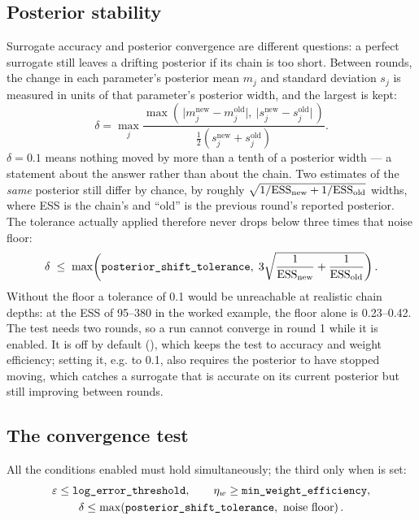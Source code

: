 \subsection{Posterior stability}

Surrogate accuracy and posterior convergence are different questions: a perfect surrogate still
leaves a drifting posterior if its chain is too short. Between rounds, the change in each
parameter's posterior mean $m_j$ and standard deviation $s_j$ is measured in units of that
parameter's posterior width, and the largest is kept:
\begin{equation}
  \delta = \max_j
  \frac{\max\!\left(\,\big|m_j^{\mathrm{new}} - m_j^{\mathrm{old}}\big|,\ \big|s_j^{\mathrm{new}} - s_j^{\mathrm{old}}\big|\,\right)}
       {\tfrac12\left(s_j^{\mathrm{new}} + s_j^{\mathrm{old}}\right)} .
  \label{eq:delta}
\end{equation}
$\delta = 0.1$ means nothing moved by more than a tenth of a posterior width --- a statement about
the answer rather than about the chain. Two estimates of the \emph{same} posterior still differ by
chance, by roughly $\sqrt{1/\mathrm{ESS}_{\mathrm{new}} + 1/\mathrm{ESS}_{\mathrm{old}}}$ widths, where ESS is the
chain's and ``old'' is the previous round's reported posterior. The tolerance actually applied
therefore never drops below three times that noise floor:
\begin{equation}
  \delta \;\le\; \max\!\left(\texttt{posterior\_shift\_tolerance},\;
  3\sqrt{\frac{1}{\mathrm{ESS}_{\mathrm{new}}} + \frac{1}{\mathrm{ESS}_{\mathrm{old}}}}\right).
  \label{eq:stability}
\end{equation}
Without the floor a tolerance of 0.1 would be unreachable at realistic chain depths: at the ESS of
95--380 in the worked example, the floor alone is 0.23--0.42. The test needs two rounds, so a run
cannot converge in round 1 while it is enabled. It is off by default
(), which keeps the test to accuracy and weight efficiency;
setting it, e.g. to 0.1, also requires the posterior to have stopped moving, which catches a surrogate
that is accurate on its current posterior but still improving between rounds.

\subsection{The convergence test}

All the conditions enabled must hold simultaneously; the third only when
 is set:
\begin{gather}
  \varepsilon \le \texttt{log\_error\_threshold},
  \qquad
  \effw \ge \texttt{min\_weight\_efficiency},
  \notag\\
  \delta \le \max\!\left(\texttt{posterior\_shift\_tolerance},\ \text{noise floor}\right).
\end{gather}

